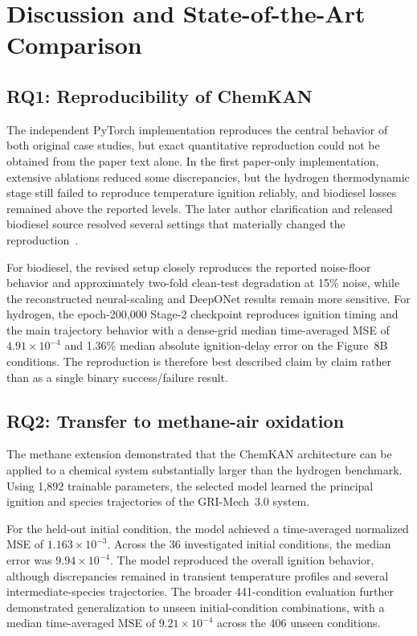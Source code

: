 \documentclass[11pt,a4paper]{article}
\begin{document}
\section{Discussion and State-of-the-Art Comparison}

\subsection{RQ1: Reproducibility of ChemKAN}

The independent PyTorch implementation reproduces the central behavior of both original case studies, but exact quantitative reproduction could not be obtained from the paper text alone. In the first paper-only implementation, extensive ablations reduced some discrepancies, but the hydrogen thermodynamic stage still failed to reproduce temperature ignition reliably, and biodiesel losses remained above the reported levels. The later author clarification and released biodiesel source resolved several settings that materially changed the reproduction~\cite{ChemKANAuthors2026,ChemKANRepo2026}.

For biodiesel, the revised setup closely reproduces the reported noise-floor behavior and approximately two-fold clean-test degradation at 15\% noise, while the reconstructed neural-scaling and DeepONet results remain more sensitive. For hydrogen, the epoch-200,000 Stage-2 checkpoint reproduces ignition timing and the main trajectory behavior with a dense-grid median time-averaged MSE of $4.91\times10^{-4}$ and 1.36\% median absolute ignition-delay error on the Figure~8B conditions. The reproduction is therefore best described claim by claim rather than as a single binary success/failure result.


\subsection{RQ2: Transfer to methane-air oxidation}

The methane extension demonstrated that the ChemKAN
architecture can be applied to a chemical system
substantially larger than the hydrogen benchmark.
Using 1,892 trainable parameters, the selected
model learned the principal ignition and species
trajectories of the GRI-Mech~3.0 system.

For the held-out initial condition, the model
achieved a time-averaged normalized MSE of
$1.163\times10^{-3}$. Across the 36 investigated
initial conditions, the median error was
$9.94\times10^{-4}$. The model reproduced the
overall ignition behavior, although discrepancies
remained in transient temperature profiles
and several intermediate-species trajectories.
The broader 441-condition evaluation further
demonstrated generalization to unseen
initial-condition combinations, with a median
time-averaged MSE of $9.21\times10^{-4}$
across the 406 unseen conditions.
\end{document}
